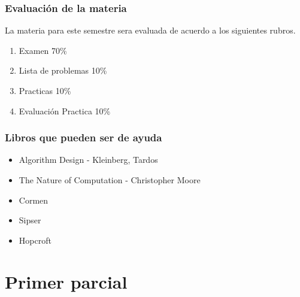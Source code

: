 \documentclass[10pt,executivepaper]{article}
\begin{document}
\subsubsection{Evaluación de la materia}
La materia para este semestre sera evaluada de acuerdo a los siguientes rubros.
 \renewcommand{\labelenumi}{\Roman{enumi}}
\begin{enumerate}

	\item Examen 70\%
	\item Lista de problemas 10\%
	\item Practicas 10\%
	\item Evaluación Practica 10\%
\end{enumerate}
\subsubsection{Libros que pueden ser de ayuda}
\begin{itemize}
	\item Algorithm Design - Kleinberg, Tardos
	\item The Nature of Computation - Christopher Moore
	\item Cormen
	\item Sipser
	\item Hopcroft
\end{itemize}
\section{Primer parcial}
\end{document}
